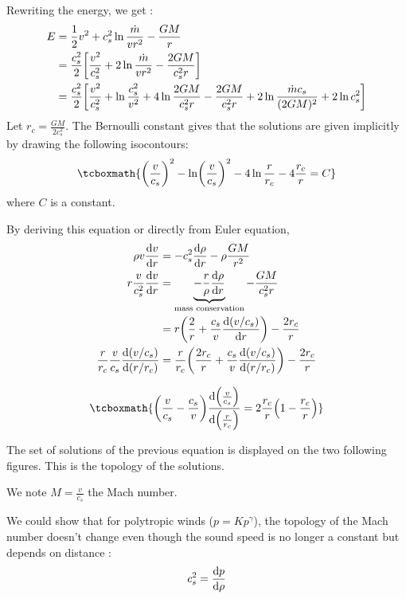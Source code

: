 \documentclass[10pt,a4paper,english]{article}
\let\originalleft\left
\let\originalright\right
\renewcommand{\left}{\mathopen{}\mathclose\bgroup\originalleft}
\renewcommand{\right}{\aftergroup\egroup\originalright}
\begin{document}
Rewriting the energy, we get :
\begin{align}
    E &= \frac{1}{2}v^2 + c_s^2 \ln \frac{\dot{m}}{vr^2} - \frac{GM}{r} \\
      &= \frac{c_s^2}{2}\left[ \frac{v^2}{c_s^2} + 2\ln \frac{\dot{m}}{vr^2} - \frac{2GM}{c_s^2r}\right] \\
      &= \frac{c_s^2}{2} \left[\frac{v^2}{c_s^2} + \ln \frac{c_s^2}{v^2} + 4\ln \frac{2GM}{c_s^2r} - \frac{2GM}{c_s^2r} + 2\ln \frac{\dot{m}c_s}{(2GM)^2} + 2\ln c_s^2\right]
\end{align}
Let $r_c = \frac{GM}{2c_s^2}$. The Bernoulli constant gives that the solutions are given implicitly by drawing the following isocontours:
\begin{equation}
    \tcboxmath{
        \left( \frac{v}{c_s} \right)^2 - \ln \left( \frac{v}{c_s} \right)^2 - 4\ln \frac{r}{r_c} - 4 \frac{r_c }{r} = C
    }
\end{equation}
where $C$ is a constant.

By deriving this equation or directly from Euler equation,
\begin{align}
    \rho v \frac{\d v}{\d r}  &= -c_s^2 \frac{\d \rho}{\d r} - \rho \frac{GM}{r^2} \\
    r \frac{v}{c_s^2} \frac{\d v}{\d r} &= \underbrace{-\frac{r}{\rho}\frac{\d \rho}{\d r}}_\textrm{mass conservation} - \frac{GM}{c_s^2r} \\
                                        &= r \left( \frac{2}{r} + \frac{c_s}{v} \frac{\d(v/c_s)}{\d r} \right) - \frac{2r_c }{r} \\
    \frac{r}{r_c }\frac{v}{c_s }\frac{\d (v/c_s)}{\d (r/r_c)} & = \frac{r}{r_c} \left( \frac{2r_c }{r} + \frac{c_s}{v} \frac{\d(v/c_s)}{\d(r/r_c )} \right) - \frac{2r_c }{r}
\end{align}

\begin{equation}
    \label{eq:speed_eq}
    \tcboxmath{
        \left( \frac{v}{c_s} - \frac{c_s}{v} \right) \frac{\d \left( \frac{v}{c_s} \right) }{\d \left( \frac{r}{r_c } \right) } = 2 \frac{r_c}{r} \left( 1 - \frac{r_c }{r} \right)
    }
\end{equation}

The set of solutions of the previous equation is displayed on the two following figures. This is the topology of the solutions.

We note $M = \frac{v}{c_s}$ the Mach number.

We could show that for polytropic winds ($p = Kp^\gamma$), the topology of the Mach number doesn't change even though the sound speed is no longer a constant but depends on distance :
\begin{equation}
    c_s^2 = \frac{\mathrm{d} p}{\mathrm{d} \rho}
\end{equation}
\end{document}

